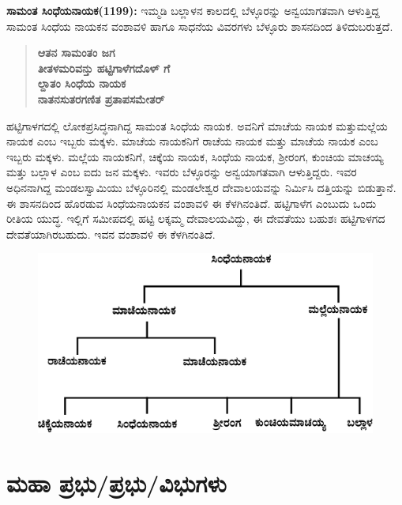 \textbf{ಸಾಮಂತ ಸಿಂಧೆಯನಾಯಕ(1199):} ಇಮ್ಮಡಿ ಬಲ್ಲಾಳನ ಕಾಲದಲ್ಲಿ ಬೆಳ್ಳೂರನ್ನು ಅನ್ವಯಾಗತವಾಗಿ ಆಳುತ್ತಿದ್ದ ಸಾಮಂತ ಸಿಂಧೆಯ ನಾಯಕನ ವಂಶಾವಳಿ ಹಾಗೂ ಸಾಧನೆಯ ವಿವರಗಳು ಬೆಳ್ಳೂರು ಶಾಸನದಿಂದ ತಿಳಿದುಬರುತ್ತದೆ.

\begin{verse}
\textbf{ಆತನ ಸಾಮಂತಂ ಜಗ} \\\textbf{ತೀತಳಮರಿವನ್ತು ಹಟ್ಟಿಗಾಳೆಗದೊಳ್​ ಗೆ} \\\textbf{ಲ್ದಾತಂ ಸಿಂಧೆಯ ನಾಯಕ } \\\textbf{ನಾತನಸುತರಗಣಿತ ಪ್ರತಾಪಸಮೇತರ್​ }
\end{verse}

ಹಟ್ಟಿಗಾಳಗದಲ್ಲಿ ಲೋಕಪ್ರಸಿದ್ಧನಾಗಿದ್ದ ಸಾಮಂತ ಸಿಂಧೆಯ ನಾಯಕ. ಅವನಿಗೆ ಮಾಚೆಯ ನಾಯಕ ಮತ್ತು\break ಮಲ್ಲೆಯ ನಾಯಕ ಎಂಬ ಇಬ್ಬರು ಮಕ್ಕಳು. ಮಾಚೆಯ ನಾಯಕನಿಗೆ ರಾಚೆಯ ನಾಯಕ ಮತ್ತು ಮಾಚೆಯ ನಾಯಕ ಎಂಬ ಇಬ್ಬರು ಮಕ್ಕಳು. ಮಲ್ಲೆಯ ನಾಯಕನಿಗೆ, ಚಿಕ್ಕೆಯ ನಾಯಕ, ಸಿಂಧೆಯ ನಾಯಕ, ಶ‍್ರೀರಂಗ, ಕುಂಚಿಯ ಮಾಚಯ್ಯ ಮತ್ತು ಬಲ್ಲಾಳ ಎಂಬ ಐದು ಜನ ಮಕ್ಕಳು. ಇವರು ಬೆಳ್ಳೂರನ್ನು ಅನ್ವಯಾಗತವಾಗಿ ಆಳುತ್ತಿದ್ದರು. ಇವರ ಅಧಿನನಾಗಿದ್ದ ಮಂಡಲಸ್ವಾಮಿಯು ಬೆಳ್ಳೂರಿನಲ್ಲಿ ಮಂಡಲೇಶ್ವರ ದೇವಾಲಯವನ್ನು ನಿರ್ಮಿಸಿ ದತ್ತಿಯನ್ನು ಬಿಡುತ್ತಾನೆ. ಈ ಶಾಸನದಿಂದ ಹೊರಡುವ ಸಿಂಧೆಯನಾಯಕನ ವಂಶಾವಳಿ ಈ ಕೆಳಗಿನಂತಿದೆ. ಹಟ್ಟಿಗಾಳೆಗ ಎಂಬುದು ಒಂದು ರೀತಿಯ ಯುದ್ಧ. ಇಲ್ಲಿಗೆ ಸಮೀಪದಲ್ಲಿ ಹಟ್ಟಿ ಲಕ್ಕಮ್ಮ ದೇವಾಲಯವಿದ್ದು, ಈ ದೇವತೆಯು ಬಹುಶಃ ಹಟ್ಟಿಗಾಳಗದ ದೇವತೆಯಾಗಿರಬಹುದು. ಇವನ ವಂಶಾವಳಿ ಈ ಕೆಳಗಿನಂತಿದೆ.
\begin{figure}[H]
\includegraphics[scale=1.2]{images/chap3/chap3fig9.jpeg}
\end{figure}


\section*{ಮಹಾ ಪ್ರಭು/ಪ್ರಭು/ವಿಭುಗಳು}

